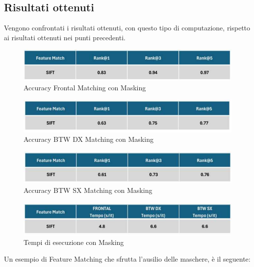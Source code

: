 \documentclass[12pt,a4paper,openright,twoside]{book}
\begin{document}
\begin{figure}[H]
	\centering
    	
\end{figure} 

\subsection{Risultati ottenuti}
Vengono confrontati i risultati ottenuti, con questo tipo di computazione, rispetto ai risultati ottenuti nei punti precedenti.
\begin{figure}[H]
	\centering
	\includegraphics{figures/frontal2.pdf}
    	\caption{Accuracy Frontal Matching con Masking}
	\label{fig:frontal2}
\end{figure}
\begin{figure}[H]
	\centering
	\includegraphics{figures/dx2.pdf}
    	\caption{Accuracy BTW DX Matching con Masking}
	\label{fig:dx2}
\end{figure}
\begin{figure}[H]
	\centering
	\includegraphics{figures/sx2.pdf}
    	\caption{Accuracy BTW SX Matching con Masking}
	\label{fig:sx2}
\end{figure}
\begin{figure}[H]
	\centering
	\includegraphics{figures/tempi2.pdf}
   	\caption{Tempi di esecuzione con Masking}
	\label{fig:tempi2}
\end{figure}
Un esempio di Feature Matching che sfrutta l'ausilio delle maschere, è il seguente:
\end{document}
